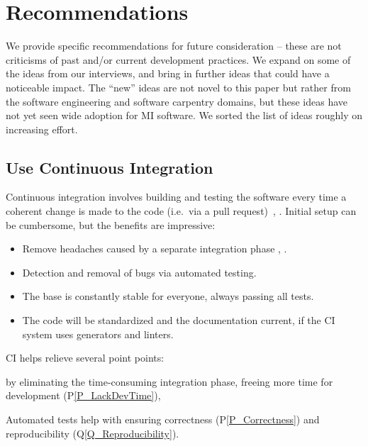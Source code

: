 \documentclass[draft, 12pt, 3p, times]{elsarticle} %
\newcommand{\ppref}[1]{P\ref{#1}}
\newcommand{\qref}[1]{Q\ref{#1}}
\begin{document}
\section{Recommendations} \label{ch_recommendations}

We provide specific recommendations for future consideration -- these are not
criticisms of past and/or current development practices. We expand on some of
the ideas from our interviews, and bring in further ideas that could have a
noticeable impact. The ``new'' ideas are not novel to this paper but rather from
the software engineering and software carpentry domains, but these ideas have
not yet seen wide adoption for MI software.  We sorted the list of ideas roughly
on increasing effort.

\subsection{Use Continuous Integration} \label{Sec_ContinuousIntegration}

Continuous integration involves building and testing the software every time a
coherent change is made to the code (i.e.\ via a pull request)~\cite[p.\ 13]
{HumbleAndFarley2010}, \cite{ShahinEtAl2017, Fowler2006}. Initial setup can be
cumbersome, but the benefits are impressive:

\begin{itemize}
    \item Remove headaches caused by a separate integration phase
    \cite[p.\ 20]{HumbleAndFarley2010}, \cite{Fowler2006}.
    \item Detection and removal of bugs \cite{Fowler2006} via
    automated testing.  
    \item The base is constantly stable for everyone, always passing all tests.
    \item The code will be standardized and the documentation current, if the CI
    system uses generators and linters.
\end{itemize}

CI helps relieve several point points:
\begin{enumerate*}
\item by eliminating the time-consuming integration phase, 
freeing more time for development (\ppref{P_LackDevTime}),
\item Automated tests help with ensuring
correctness (\ppref{P_Correctness}) and reproducibility
(\qref{Q_Reproducibility}). 
\end{enumerate*}
\end{document}
